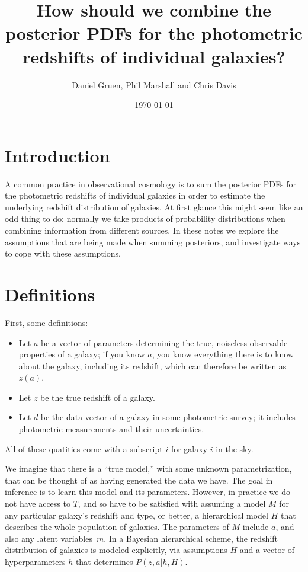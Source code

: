 \documentclass[11pt]{amsart}
\title{How should we combine the posterior PDFs for the photometric redshifts of individual galaxies?}
\author{Daniel Gruen, Phil Marshall and Chris Davis}
\date{\today}
\begin{document}
\maketitle

\section{Introduction}

A common practice in observational cosmology is to sum the posterior
PDFs for the photometric redshifts of individual galaxies in order to
estimate the underlying redshift distribution of galaxies.  At first
glance this might seem like an odd thing to do: normally we take
products of probability distributions when combining information from
different sources. In these notes we explore the assumptions that are
being made when summing posteriors, and investigate ways to cope with
these assumptions.

\section{Definitions}

First, some definitions:
\begin{itemize}
\item Let $a$ be a vector of parameters determining the true, noiseless
observable properties of a galaxy; if you know $a$, you know everything
there is to know about the galaxy, including its redshift, which can therefore be written as $z(a)$.
\item Let $z$ be the true redshift of a galaxy.
\item Let $d$ be the data vector of a galaxy in some photometric survey;
it includes photometric measurements and their uncertainties.
\end{itemize}
All of these quatities come with a subscript $i$ for galaxy $i$ in the sky.

We imagine that there is a ``true model,'' with some unknown
parametrization, that can be thought of as having generated the data we
have. The goal in inference is to learn this model and its parameters.
However, in practice we do not have access to $T$, and so have to be
satisfied with assuming a model $M$ for any particular galaxy's redshift
and type, or better, a hierarchical model $H$ that describes the whole
population of galaxies. The parameters of $M$ include $a$, and also any
latent variables~$m$.  In a Bayesian hierarchical scheme, the redshift
distribution of galaxies is modeled explicitly, via assumptions $H$ and
a vector of hyperparameters $h$ that determines $P(z,a|h,H)$.
\end{document}
